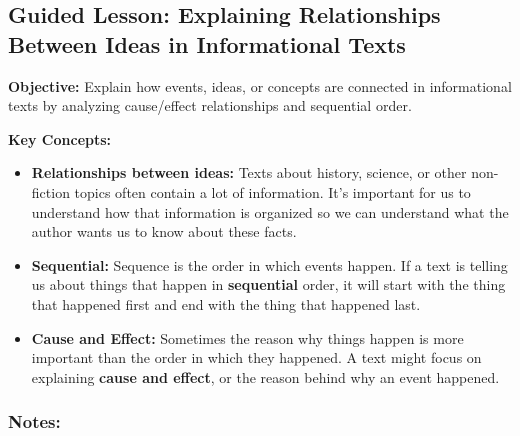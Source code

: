 \documentclass[12pt]{article}
\title{}
\date{}
\begin{document}
\subsection*{Guided Lesson: Explaining Relationships Between Ideas in Informational Texts}
\onehalfspacing

\begin{tcolorbox}[colframe=black!40, colback=gray!5, 
coltitle=black, colbacktitle=black!20, fonttitle=\bfseries\Large, 
title=Learning Objective, halign title=center, left=5pt, right=5pt, top=5pt, bottom=15pt]
\textbf{Objective:} Explain how events, ideas, or concepts are connected in informational texts by analyzing cause/effect relationships and sequential order. 
\end{tcolorbox}


\vspace{1em}

\begin{tcolorbox}[colframe=black!60, colback=white, 
coltitle=black, colbacktitle=black!15, fonttitle=\bfseries\Large, 
title=Key Concepts and Vocabulary, halign title=center, left=10pt, right=10pt, top=10pt, bottom=15pt]
\textbf{Key Concepts:}
\begin{itemize}
    \item \textbf{Relationships between ideas:} Texts about history, science, or other non-fiction topics often contain a lot of information. It's important for us to understand how that information is organized so we can understand what the author wants us to know about these facts.
    \item \textbf{ Sequential:} Sequence is the order in which events happen. If a text is telling us about things that happen in \textbf{sequential} order, it will start with the thing that happened first and end with the thing that happened last. 
    \item \textbf{Cause and Effect:} Sometimes the reason why things happen is more important than the order in which they happened. A text might focus on explaining \textbf{cause and effect}, or the reason behind why an event happened.
\end{itemize}
\end{tcolorbox}

\vspace{1em}

\subsubsection*{Notes:}
\noindent \underline{\hspace{17cm}} \\[1.2cm]
\noindent \underline{\hspace{17cm}} \\[1.2cm]
\noindent \underline{\hspace{17cm}} \\[1.2cm]
\end{document}
